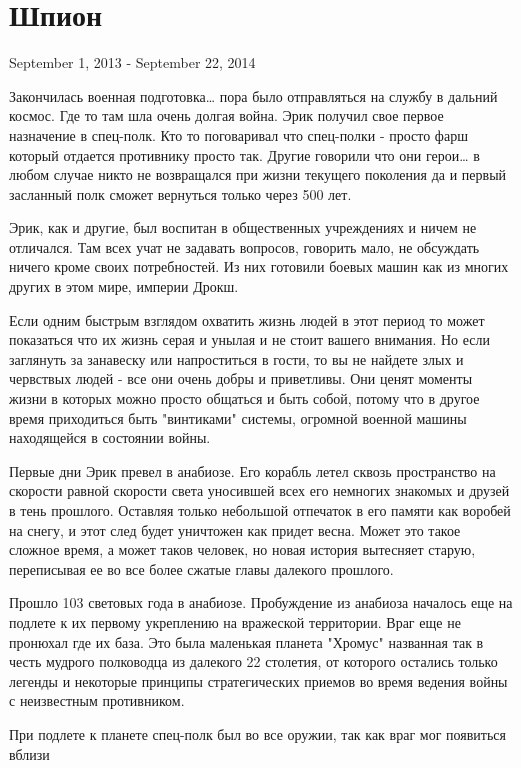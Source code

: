 \newpage
\chapter{Шпион}
{\centering
	September 1, 2013 - September 22, 2014\par
}
\par
Закончилась военная подготовка… пора было отправляться
на службу в дальний космос. Где то там шла очень долгая война.
Эрик получил свое первое назначение в спец-полк.
Кто то поговаривал что спец-полки - просто фарш который отдается
противнику просто так. Другие говорили что они герои… в любом случае
никто не возвращался при жизни текущего поколения да и первый засланный
полк сможет вернуться только через 500 лет.
\par
Эрик, как и другие, был воспитан в общественных учреждениях и
ничем не отличался. Там всех учат не задавать вопросов, говорить мало,
не обсуждать ничего кроме своих потребностей. Из них готовили боевых машин
как из многих других в этом мире, империи Дрокш.
\par
Если одним быстрым взглядом охватить жизнь людей в этот период то может
показаться что их жизнь серая и унылая и не стоит вашего внимания.
Но если заглянуть за занавеску или напроститься в гости, то вы не найдете
злых и червствых людей - все они очень добры и приветливы.
Они ценят моменты жизни в которых можно просто общаться и быть собой,
потому что в другое время приходиться быть "винтиками" системы, огромной военной машины
находящейся в состоянии войны.
\par
Первые дни Эрик превел в анабиозе. Его корабль летел сквозь пространство 
на скорости равной скорости света уносившей всех его немногих знакомых и друзей
в тень прошлого. Оставляя только небольшой отпечаток в его памяти как воробей на 
снегу, и этот след будет уничтожен как придет весна. Может это такое сложное время,
а может таков человек, но новая история вытесняет старую, переписывая ее во все более
сжатые главы далекого прошлого.
\par
Прошло 103 световых года в анабиозе.
Пробуждение из анабиоза началось еще на подлете к их первому укреплению на вражеской территории.
Враг еще не пронюхал где их база. Это была маленькая планета "Хромус" названная так в честь
мудрого полководца из далекого 22 столетия, от которого остались только легенды
и некоторые принципы стратегических приемов во время ведения войны с неизвестным противником.
\par
При подлете к планете спец-полк был во все оружии, так как враг мог появиться вблизи
